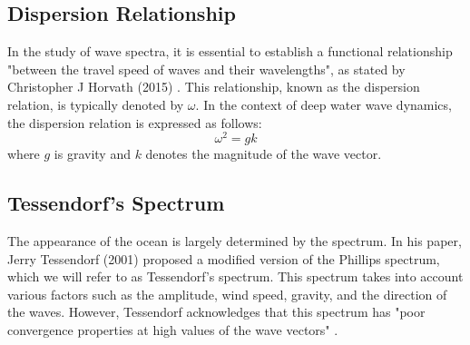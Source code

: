 \subsection{Dispersion Relationship}
In the study of wave spectra, it is essential to establish a functional relationship "between the travel speed of waves and their wavelengths", as stated by Christopher J Horvath (2015) \cite{horvath2015}. This relationship, known as the dispersion relation, is typically denoted by $\omega$. In the context of deep water wave dynamics, the dispersion relation is expressed as follows:
$$
\omega^2 = gk
$$
where $g$ is gravity and $k$ denotes the magnitude of the wave vector.

\subsection{Tessendorf's Spectrum}
The appearance of the ocean is largely determined by the spectrum. In his paper, Jerry Tessendorf (2001) \cite{tessendorf2001} proposed a modified version of the Phillips spectrum, which we will refer to as Tessendorf's spectrum. This spectrum takes into account various factors such as the amplitude, wind speed, gravity, and the direction of the waves. However, Tessendorf acknowledges that this spectrum has "poor convergence properties at high values of the wave vectors" \cite{tessendorf2001}.

